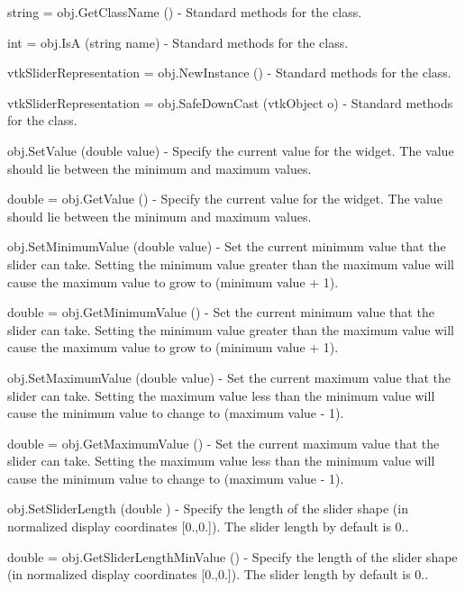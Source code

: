 \begin{DoxyItemize}
\item {\ttfamily string = obj.\-Get\-Class\-Name ()} -\/ Standard methods for the class.  
\item {\ttfamily int = obj.\-Is\-A (string name)} -\/ Standard methods for the class.  
\item {\ttfamily vtk\-Slider\-Representation = obj.\-New\-Instance ()} -\/ Standard methods for the class.  
\item {\ttfamily vtk\-Slider\-Representation = obj.\-Safe\-Down\-Cast (vtk\-Object o)} -\/ Standard methods for the class.  
\item {\ttfamily obj.\-Set\-Value (double value)} -\/ Specify the current value for the widget. The value should lie between the minimum and maximum values.  
\item {\ttfamily double = obj.\-Get\-Value ()} -\/ Specify the current value for the widget. The value should lie between the minimum and maximum values.  
\item {\ttfamily obj.\-Set\-Minimum\-Value (double value)} -\/ Set the current minimum value that the slider can take. Setting the minimum value greater than the maximum value will cause the maximum value to grow to (minimum value + 1).  
\item {\ttfamily double = obj.\-Get\-Minimum\-Value ()} -\/ Set the current minimum value that the slider can take. Setting the minimum value greater than the maximum value will cause the maximum value to grow to (minimum value + 1).  
\item {\ttfamily obj.\-Set\-Maximum\-Value (double value)} -\/ Set the current maximum value that the slider can take. Setting the maximum value less than the minimum value will cause the minimum value to change to (maximum value -\/ 1).  
\item {\ttfamily double = obj.\-Get\-Maximum\-Value ()} -\/ Set the current maximum value that the slider can take. Setting the maximum value less than the minimum value will cause the minimum value to change to (maximum value -\/ 1).  
\item {\ttfamily obj.\-Set\-Slider\-Length (double )} -\/ Specify the length of the slider shape (in normalized display coordinates \mbox{[}0.,0.\mbox{]}). The slider length by default is 0..  
\item {\ttfamily double = obj.\-Get\-Slider\-Length\-Min\-Value ()} -\/ Specify the length of the slider shape (in normalized display coordinates \mbox{[}0.,0.\mbox{]}). The slider length by default is 0..  

\end{DoxyItemize}
